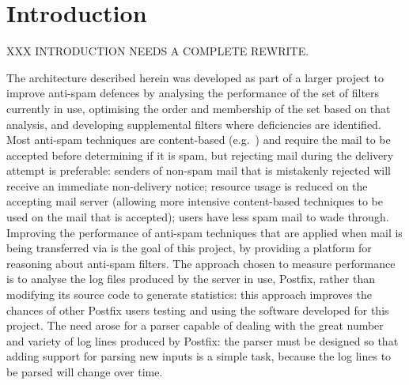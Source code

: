 \chapter{Introduction}

\label{introduction}

XXX INTRODUCTION NEEDS A COMPLETE REWRITE\@.

The architecture described herein was developed as part of a larger project
to improve anti-spam defences by analysing the performance of the set of
filters currently in use, optimising the order and membership of the set
based on that analysis, and developing supplemental filters where
deficiencies are identified.  Most anti-spam techniques are content-based
(e.g.~\cite{a-plan-for-spam, word-stemming, relaxed-online-svms}) and
require the mail to be accepted before determining if it is spam, but
rejecting mail during the delivery attempt is preferable: senders of
non-spam mail that is mistakenly rejected will receive an immediate
non-delivery notice; resource usage is reduced on the accepting mail server
(allowing more intensive content-based techniques to be used on the mail
that is accepted); users have less spam mail to wade through.  Improving
the performance of anti-spam techniques that are applied when mail is being
transferred via  is the goal of this project, by providing a
platform for reasoning about anti-spam filters.  The approach chosen to
measure performance is to analyse the log files produced by the
 server in use, Postfix, rather than modifying its source
code to generate statistics: this approach improves the chances of other
Postfix users testing and using the software developed for this project.
The need arose for a parser capable of dealing with the great number and
variety of log lines produced by Postfix: the parser must be designed so
that adding support for parsing new inputs is a simple task, because the
log lines to be parsed will change over time.

